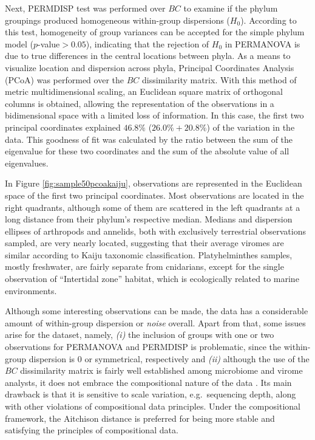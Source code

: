 \documentclass[
  openany]{book}
\begin{document}
Next, PERMDISP test was performed over \(BC\) to examine if the phylum groupings produced homogeneous within-group dispersions (\(H_0\)). According to this test, homogeneity of group variances can be accepted for the simple phylum model (\(p\)-value\(> 0.05\)), indicating that the rejection of \(H_0\) in PERMANOVA is due to true differences in the central locations between phyla. As a means to visualize location and dispersion across phyla, Principal Coordinates Analysis (PCoA) was performed over the \(BC\) dissimilarity matrix. With this method of metric multidimensional scaling, an Euclidean square matrix of orthogonal columns is obtained, allowing the representation of the observations in a bidimensional space with a limited loss of information. In this case, the first two principal coordinates explained \(46.8\%\) (\(26.0\% + 20.8\%\)) of the variation in the data. This goodness of fit was calculated by the ratio between the sum of the eigenvalue for these two coordinates and the sum of the absolute value of all eigenvalues.

In Figure \ref{fig:sample50pcoakaiju}, observations are represented in the Euclidean space of the first two principal coordinates. Most observations are located in the right quadrants, although some of them are scattered in the left quadrants at a long distance from their phylum's respective median. Medians and dispersion ellipses of arthropods and annelids, both with exclusively terrestrial observations sampled, are very nearly located, suggesting that their average viromes are similar according to Kaiju taxonomic classification. Platyhelminthes samples, mostly freshwater, are fairly separate from cnidarians, except for the single observation of ``Intertidal zone'' habitat, which is ecologically related to marine environments.

Although some interesting observations can be made, the data has a considerable amount of within-group dispersion or \emph{noise} overall. Apart from that, some issues arise for the dataset, namely, \emph{(i)} the inclusion of groups with one or two observations for PERMANOVA and PERMDISP is problematic, since the within-group dispersion is 0 or symmetrical, respectively and \emph{(ii)} although the use of the \(BC\) dissimilarity matrix is fairly well established among microbiome and virome analysts, it does not embrace the compositional nature of the data \autocite{Gloor2017}. Its main drawback is that it is sensitive to scale variation, e.g.~sequencing depth, along with other violations of compositional data principles. Under the compositional framework, the Aitchison distance is preferred for being more stable and satisfying the principles of compositional data.
\end{document}
